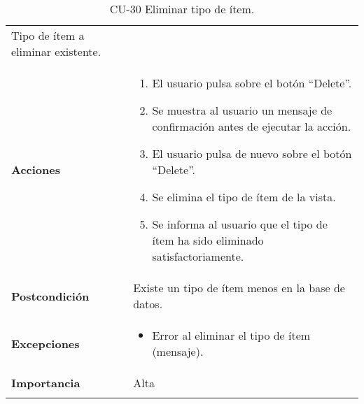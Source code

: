 \begin{longtable}[]{@{}ll@{}}
\begin{minipage}[t]{0.71\columnwidth}
Tipo de ítem a eliminar existente.\strut
\end{minipage}\tabularnewline
\begin{minipage}[t]{0.23\columnwidth}\raggedright
\textbf{Acciones}\strut
\end{minipage} & \begin{minipage}[t]{0.71\columnwidth}\raggedright
\begin{enumerate}
\def\labelenumi{\arabic{enumi}.}
\tightlist
\item
  El usuario pulsa sobre el botón ``Delete''.
\item
  Se muestra al usuario un mensaje de confirmación antes de ejecutar la
  acción.
\item
  El usuario pulsa de nuevo sobre el botón ``Delete''.
\item
  Se elimina el tipo de ítem de la vista.
\item
  Se informa al usuario que el tipo de ítem ha sido eliminado
  satisfactoriamente.
\end{enumerate}\strut
\end{minipage}\tabularnewline
\begin{minipage}[t]{0.23\columnwidth}\raggedright
\textbf{Postcondición}\strut
\end{minipage} & \begin{minipage}[t]{0.71\columnwidth}\raggedright
Existe un tipo de ítem menos en la base de datos.\strut
\end{minipage}\tabularnewline
\begin{minipage}[t]{0.23\columnwidth}\raggedright
\textbf{Excepciones}\strut
\end{minipage} & \begin{minipage}[t]{0.71\columnwidth}\raggedright
\begin{itemize}
\tightlist
\item
  Error al eliminar el tipo de ítem (mensaje).
\end{itemize}\strut
\end{minipage}\tabularnewline
\begin{minipage}[t]{0.23\columnwidth}\raggedright
\textbf{Importancia}\strut
\end{minipage} & \begin{minipage}[t]{0.71\columnwidth}\raggedright
Alta\strut
\end{minipage}\tabularnewline
\bottomrule
\caption{CU-30 Eliminar tipo de ítem.}
\end{longtable}

